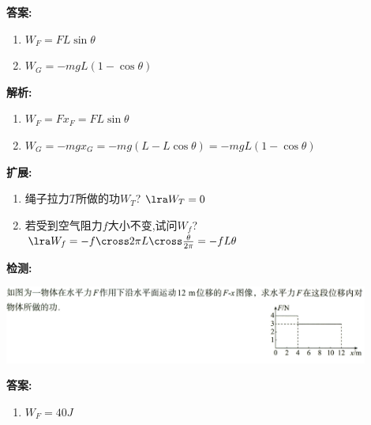\documentclass{article}
\begin{document}
\begin{itemize}
\begin{enumerate}
                  \vspace{1em}

                  \textbf{答案:}
                  \begin{enumerate}[label=(\arabic*)]
                      \item $W_{F} = FL\sin{\theta} $
                      \item $W_{G} = -mgL(1-\cos{\theta})$
                  \end{enumerate}

                  \textbf{解析:}
                  \begin{enumerate}[label=(\arabic*)]
                      \item $W_{F} = F x_{F} = F L \sin{\theta} $
                      \item $W_{G} = -mg x_{G} = -mg(L - L \cos{\theta}) = -mgL(1-\cos{\theta})$
                  \end{enumerate}

                  \textbf{扩展:}
                  \begin{enumerate}[label=(\arabic*)]
                      \item 绳子拉力$T$所做的功$W_{T}$? $\lra W_{T} = 0$
                      \item 若受到空气阻力$f$大小不变,试问$W_{f}$? $\lra W_{f} = -f \cross 2\pi L \cross \frac{\theta}{2 \pi} = -fL\theta $
                  \end{enumerate}

                  \vspace{2em}

                  \textbf{检测:}

                  \includegraphics[width=0.9\textwidth]{pictures/3.png}

                  \vspace{1em}

                  \textbf{答案:}
                  \begin{enumerate}[label=(\arabic*)]
                      \item[] $W_{F} = 40J $
                  \end{enumerate}


\end{enumerate}
\end{itemize}
\end{document}
